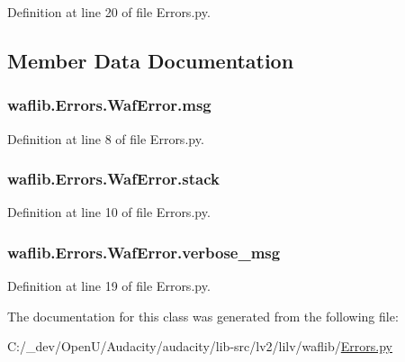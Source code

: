 Definition at line 20 of file Errors.\+py.



\subsection{Member Data Documentation}
\subsubsection[{\texorpdfstring{msg}{msg}}]{\setlength{\rightskip}{0pt plus 5cm}waflib.\+Errors.\+Waf\+Error.\+msg}\hypertarget{classwaflib_1_1_errors_1_1_waf_error_a56b836e4e618bbe57e74e363480c093b}{}\label{classwaflib_1_1_errors_1_1_waf_error_a56b836e4e618bbe57e74e363480c093b}


Definition at line 8 of file Errors.\+py.

\subsubsection[{\texorpdfstring{stack}{stack}}]{\setlength{\rightskip}{0pt plus 5cm}waflib.\+Errors.\+Waf\+Error.\+stack}\hypertarget{classwaflib_1_1_errors_1_1_waf_error_a9f1dc6719108ed2d9752b7583ba4b81e}{}\label{classwaflib_1_1_errors_1_1_waf_error_a9f1dc6719108ed2d9752b7583ba4b81e}


Definition at line 10 of file Errors.\+py.

\subsubsection[{\texorpdfstring{verbose\+\_\+msg}{verbose_msg}}]{\setlength{\rightskip}{0pt plus 5cm}waflib.\+Errors.\+Waf\+Error.\+verbose\+\_\+msg}\hypertarget{classwaflib_1_1_errors_1_1_waf_error_a4bd705028384748d0f11ab03161bbeb5}{}\label{classwaflib_1_1_errors_1_1_waf_error_a4bd705028384748d0f11ab03161bbeb5}


Definition at line 19 of file Errors.\+py.



The documentation for this class was generated from the following file\+:\begin{DoxyCompactItemize}
\item 
C\+:/\+\_\+dev/\+Open\+U/\+Audacity/audacity/lib-\/src/lv2/lilv/waflib/\hyperlink{lilv_2waflib_2_errors_8py}{Errors.\+py}\end{DoxyCompactItemize}
